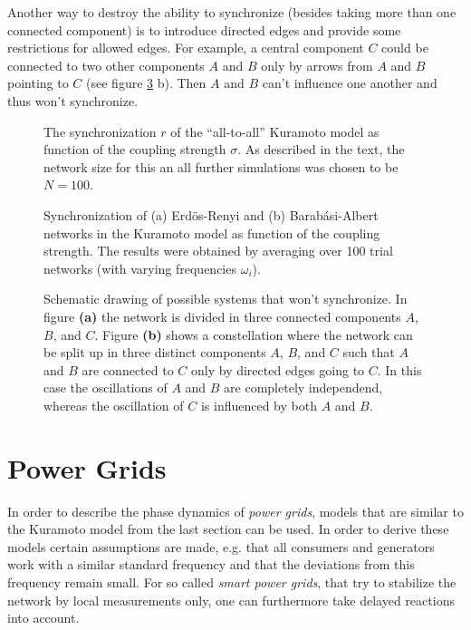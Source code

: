 \documentclass{scrartcl}
\begin{document}
Another way to destroy the ability to synchronize (besides taking more than
one connected component) is to introduce directed edges and provide some
restrictions for allowed edges. For example, a central component $C$ could
be connected to two other components $A$ and $B$ only by arrows from $A$
and $B$ pointing to $C$ (see figure \ref{fig:B13} b). Then $A$ and $B$
can't influence one another and thus won't synchronize.

\begin{figure}
    \centering
    \caption{The synchronization $r$ of the \enquote{all-to-all} Kuramoto
            model as function of the coupling strength $\sigma$. As
            described in the text, the network size for this an all further
            simulations was chosen to be $N=100$.}
    \label{fig:B11}
\end{figure}

\begin{figure}
    \centering
    \caption{Synchronization of (a) Erdös-Renyi and (b) Barab\'asi-Albert
            networks in the Kuramoto model as function of the coupling
            strength. The results were obtained by averaging over 100 trial
            networks (with varying frequencies $\omega_i$).}
    \label{fig:B12}
\end{figure}

\begin{figure}
    \centering
    \def\svgwidth{0.8\textwidth}
    
    \caption{Schematic drawing of possible systems that won't synchronize. In
        figure \textbf{(a)} the network is divided in three connected
        components $A$, $B$, and $C$. Figure \textbf{(b)} shows a constellation where the network
        can be split up in three distinct components $A$, $B$, and $C$ such that $A$ and
        $B$ are connected to $C$ only by directed edges going to $C$. In this
        case the oscillations of $A$ and $B$ are completely independend, whereas
        the oscillation of $C$ is influenced by both $A$ and $B$.}
    \label{fig:B13}
\end{figure}


\clearpage

\section{Power Grids}
In order to describe the phase dynamics of \emph{power grids}, models that
are similar to the Kuramoto model from the last section can be used.  In
order to derive these models certain assumptions are made, e.g. that all
consumers and generators work with a similar standard frequency and that
the deviations from this frequency remain small. For so called \emph{smart power
grids}, that try to stabilize the network by local measurements only, one
can furthermore take delayed reactions into account.
\end{document}
